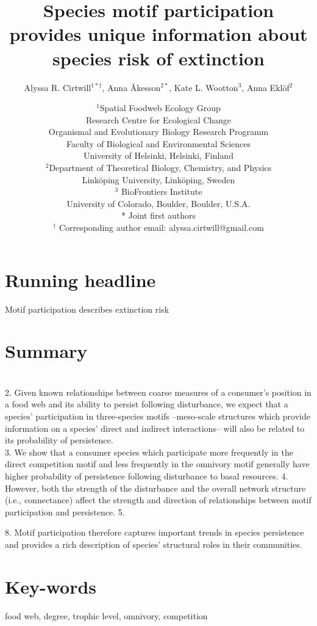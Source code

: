 \documentclass[12pt]{article}
\title{Species motif participation provides unique information about species risk of extinction}
\author{Alyssa R. Cirtwill$^{1*\dagger}$, Anna \r{A}kesson$^{2*}$, Kate L. Wootton$^{3}$, Anna Ekl\"{o}f$^{2}$}
\date{
\small$^1$Spatial Foodweb Ecology Group\\
Research Centre for Ecological Change\\
Organismal and Evolutionary Biology Research Programm\\
Faculty of Biological and Environmental Sciences\\
University of Helsinki, Helsinki, Finland\\
\medskip
\small$^2$Department of Theoretical Biology, Chemistry, and Physics\\ 
Link\"{o}ping University, Link\"{o}ping, Sweden\\
\medskip
\small$^3$ BioFrontiers Institute\\
University of Colorado, Boulder, Boulder, U.S.A.\\
\medskip
* Joint first authors\\
\medskip
$^\dagger$ Corresponding author email: alyssa.cirtwill@gmail.com\\
}
\begin{document}
 
\maketitle 
\raggedright

\setlength{\parindent}{15pt} 

\section*{Running headline}
Motif participation describes extinction risk

\clearpage

\section*{Summary}


     \\
    2. Given known relationships between coarse measures of a consumer's position in a food web and its ability to persist following disturbance, we expect that a species' participation in three-species motifs --meso-scale structures which provide information on a species' direct and indirect interactions-- will also be related to its probability of persistence.\\
    3. We show that a consumer species which participate more frequently in the direct competition motif and less frequently in the omnivory motif generally have higher probability of persistence following disturbance to basal resources.
    4. However, both the strength of the disturbance and the overall network structure (i.e., connectance) affect the strength and direction of relationships between motif participation and persistence.
    5. 
    
    8. Motif participation therefore captures important trends in species persistence and provides a rich description of species' structural roles in their communities.


\section*{Key-words}
    food web, degree, trophic level, omnivory, competition
\end{document}
